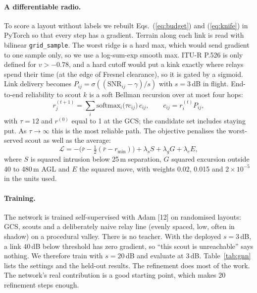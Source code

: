 \documentclass[10pt,a4paper,twocolumn]{article}
\begin{document}
\paragraph{A differentiable radio.} To score a layout without labels we rebuilt Eqs.~(\ref{eq:budget}) and (\ref{eq:knife}) in PyTorch so that every step has a gradient. Terrain along each link is read with bilinear \texttt{grid\_sample}. The worst ridge is a hard max, which would send gradient to one sample only, so we use a log-sum-exp smooth max. ITU-R P.526 is only defined for $v>-0.78$, and a hard cutoff would put a kink exactly where relays spend their time (at the edge of Fresnel clearance), so it is gated by a sigmoid. Link delivery becomes $P_{ij}=\sigma((\mathrm{SNR}_{ij}-\gamma)/s)$ with $s=3$\,dB in flight. End-to-end reliability to scout $k$ is a soft Bellman recursion over at most four hops:
\begin{equation}
r^{(t+1)}_j=\sum_{i}\mathrm{softmax}_i\big(\tau c_{ij}\big)\,c_{ij},\qquad c_{ij}=r^{(t)}_i P_{ij},
\label{eq:path}
\end{equation}
with $\tau=12$ and $r^{(0)}$ equal to 1 at the GCS; the candidate set includes staying put. As $\tau\to\infty$ this is the most reliable path. The objective penalises the worst-served scout as well as the average:
\begin{equation}
\mathcal L=-\big(\bar r-\tfrac12(\bar r-r_{\min})\big)+\lambda_s S+\lambda_g G+\lambda_e E,
\label{eq:obj}
\end{equation}
where $S$ is squared intrusion below 25\,m separation, $G$ squared excursion outside 40 to 480\,m AGL and $E$ the squared move, with weights 0.02, 0.015 and $2\times10^{-5}$ in the units used.

\paragraph{Training.} The network is trained self-supervised with Adam [12] on randomised layouts: GCS, scouts and a deliberately naive relay line (evenly spaced, low, often in shadow) on a procedural valley. There is no teacher. With the deployed $s=3$\,dB, a link 40\,dB below threshold has zero gradient, so ``this scout is unreachable'' says nothing. We therefore train with $s=20$\,dB and evaluate at 3\,dB. Table~\ref{tab:gnn} lists the settings and the held-out results. The refinement does most of the work. The network's real contribution is a good starting point, which makes 20 refinement steps enough.
\end{document}
